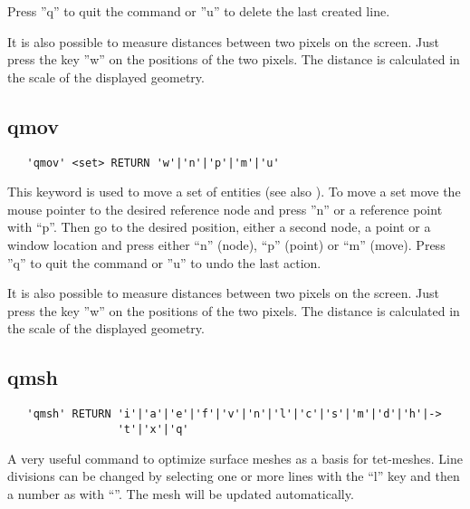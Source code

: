 \documentclass{article}
\begin{document}
Press ''q'' to quit the command or ''u'' to delete the last created line.



It is also possible to measure distances between two pixels on the screen. Just press the key ''w'' on the positions of the two pixels. The distance is calculated in the scale of the displayed geometry.


\subsection{\label{qmov}qmov}
\begin{verbatim}
   'qmov' <set> RETURN 'w'|'n'|'p'|'m'|'u'
\end{verbatim}
This keyword is used to move a set of entities (see also ). To move a set move the mouse pointer to the desired reference node and press ''n'' or a reference point with ``p''. Then go to the desired position, either a second node, a point or a window location and press either ``n'' (node), ``p'' (point) or ``m'' (move). Press ''q'' to quit the command or ''u'' to undo the last action. 

It is also possible to measure distances between two pixels on the screen. Just press the key ''w'' on the positions of the two pixels. The distance is calculated in the scale of the displayed geometry.  


\subsection{\label{qmsh}qmsh}
\begin{verbatim}
   'qmsh' RETURN 'i'|'a'|'e'|'f'|'v'|'n'|'l'|'c'|'s'|'m'|'d'|'h'|->
                 't'|'x'|'q'
\end{verbatim}
A very useful command to optimize surface meshes as a basis for tet-meshes. Line divisions can be changed by selecting one or more lines with the ``l'' key and then a number as with ``''. The mesh will be updated automatically.
\end{document}
